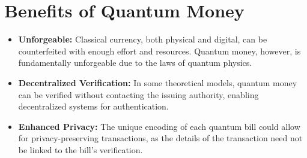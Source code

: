 \documentclass[11pt]{article}
\theoremstyle{definition}
\begin{document}

\section*{Benefits of Quantum Money}
\begin{itemize}
    \item \textbf{Unforgeable:} Classical currency, both physical and digital, can be counterfeited with enough effort and resources. Quantum money, however, is fundamentally unforgeable due to the laws of quantum physics.
    \item \textbf{Decentralized Verification:} In some theoretical models, quantum money can be verified without contacting the issuing authority, enabling decentralized systems for authentication.
    \item \textbf{Enhanced Privacy:} The unique encoding of each quantum bill could allow for privacy-preserving transactions, as the details of the transaction need not be linked to the bill's verification.
\end{itemize}
\end{document}
